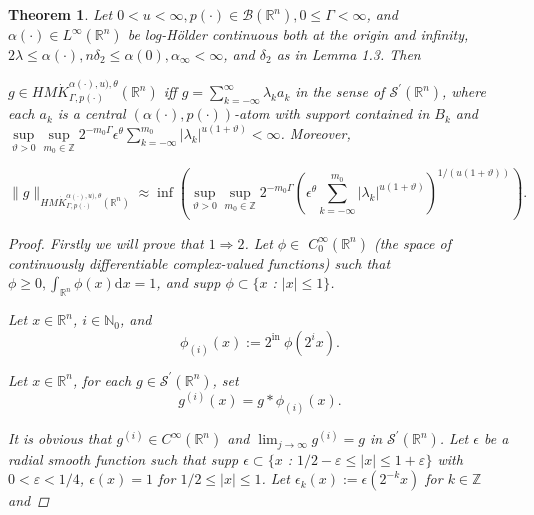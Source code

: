 \documentclass[oneside,reqno]{amsart}
\newtheorem{theorem}{Theorem}[section]
\numberwithin{equation}{section}
\theoremstyle{definition}
\begin{document}
\begin{theorem}
    

 Let $0<u<\infty, p(\cdot) \in \mathcal{B}\left(\mathbb{R}^{n}\right), 0 \leq \Gamma<\infty$, and $\alpha(\cdot) \in L^{\infty}\left(\mathbb{R}^{n}\right)$ be log-H\"older continuous both at the origin and infinity, $2 \lambda \leq  \alpha(\cdot), n \delta_{2} \leq  \alpha(0), \alpha_{\infty}<\infty$, and $\delta_{2}$ as in Lemma 1.3. Then

 $g \in H M \dot{K} ^{\alpha(\cdot),u),\theta}_{ \Gamma, p(\cdot)}(\mathbb{R}^n)$ iff $g=\sum_{k=-\infty}^{\infty} \lambda_{k} a_{k}$ in the sense of $\mathcal{S}^{\prime}\left(\mathbb{R}^{n}\right)$, where each $a_{k}$ is a central $(\alpha(\cdot), p(\cdot))$-atom with support contained in $B_{k}$ and $\sup\limits_{\vartheta>0 }\sup\limits  _{m_0\in  \mathbb{Z}} 2^{-m_0\Gamma} \epsilon  ^\theta\sum_{k=-\infty}^{m_0}\left|\lambda_{k}\right|^{u(1+\vartheta)}<\infty$. Moreover,


\begin{equation*}
\|g\|_{H M \dot{K} ^{\alpha(\cdot),u),\theta}_{ \Gamma, p(\cdot)}(\mathbb{R}^n)} \approx \inf \left(\sup_{\vartheta>0 }\sup _{m_0\in  \mathbb{Z}} 2^{-m_0\Gamma}\left(\epsilon  ^\theta\sum_{k=-\infty}^{m_0}\left|\lambda_{k}\right|^{u(1+\vartheta)}\right)^{1 / (u(1+\vartheta))} \right).
\end{equation*}









\begin{proof}

Firstly we will prove that $1\Rightarrow 2$. Let $\phi \in$ $C_{0}^{\infty}\left(\mathbb{R}^{n}\right)$ (the space of continuously differentiable complex-valued functions) such that $\phi \geqslant 0, \int_{\mathbb{R}^{n}} \phi(x) \mathrm{d} x=1$, and supp $\phi \subset\{x$ : $|x| \leq  1\}$.

Let $x \in \mathbb{R}^{n}$, $i\in  \mathbb{N}_{0}$, and $$\phi_{(i)}(x):=2^{\text {in }} \phi\left(2^{i} x\right).$$


Let $x \in \mathbb{R}^{n}$, for each $g \in \mathcal{S}^{\prime}\left(\mathbb{R}^{n}\right)$, set $$g^{(i)}(x)=g * \phi_{(i)}(x).$$

It is obvious that $g^{(i)} \in C^{\infty}\left(\mathbb{R}^{n}\right)$ and $\lim _{j \rightarrow \infty} g^{(i)}=g$ in $\mathcal{S}^{\prime}\left(\mathbb{R}^{n}\right)$. Let $\epsilon  $ be a radial smooth function such that supp $\epsilon   \subset\{x$ : $1 / 2-\varepsilon \leq |x| \leq  1+\varepsilon\}$ with $0<\varepsilon<1 / 4$, $\epsilon  (x)=1$ for $1 / 2 \leq |x| \leq  1$. Let $\epsilon  _{k}(x):=\epsilon  \left(2^{-k} x\right)$ for $k \in \mathbb{Z}$ and



\end{proof}
\end{theorem}
\end{document}
